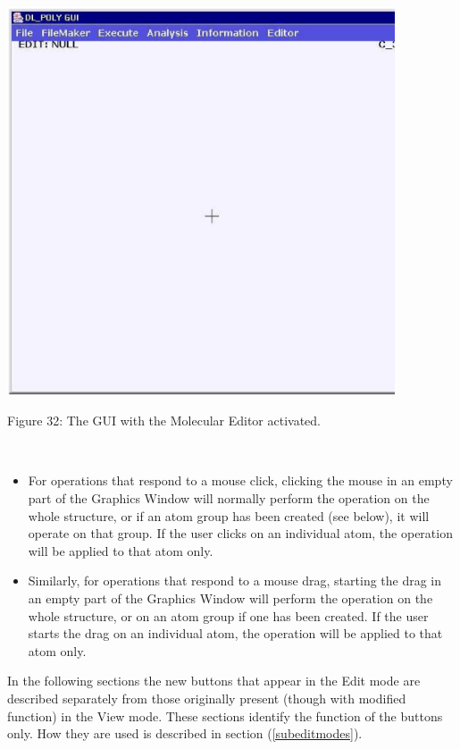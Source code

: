 \begin{center}
\centerline{\includegraphics[height=11.5cm]{editor.ps}}
\centerline{Figure 32: The GUI with the Molecular Editor activated.}
\end{center}

~

\noindent
\begin{itemize}
\item For operations that respond to a mouse click, clicking the mouse in an
  empty part of the Graphics Window will normally perform the operation on the
  whole structure, or if an atom group has been created (see below), it will
  operate on that group. If the user clicks on an individual atom, the
  operation will be applied to that atom only.
\item Similarly, for operations that respond to a mouse drag, starting the
  drag in an empty part of the Graphics Window will perform the operation on
  the whole structure, or on an atom group if one has been created. If the
  user starts the drag on an individual atom, the operation will be applied to
  that atom only.
\end{itemize}

In the following sections the new buttons that appear in the Edit mode are
described separately from those originally present (though with modified
function) in the View mode. These sections identify the function of the
buttons only. How they are used is described in section (\ref{subeditmodes}).

